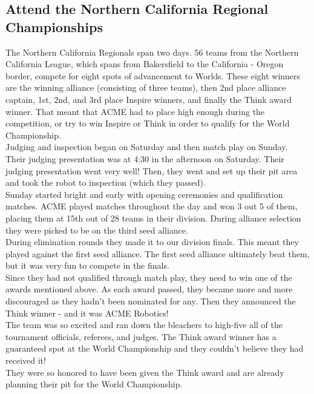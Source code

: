\documentclass{article}
\begin{document}
\subsection{Attend the Northern California Regional Championships}
The Northern California Regionals span two days. 56 teams from the Northern California League, which spans from Bakersfield to the California - Oregon border, compete for eight spots of advancement to Worlds. These eight winners are the winning alliance (consisting of three teams), then 2nd place alliance captain, 1st, 2nd, and 3rd place Inspire winners, and finally the Think award winner. That meant that ACME had to place high enough during the competition, or try to win Inspire or Think in order to qualify for the World Championship. \\

Judging and inspection began on Saturday and then match play on Sunday. Their judging presentation was at 4:30 in the afternoon on Saturday. Their judging presentation went very well! Then, they went and set up their pit area and took the robot to inspection (which they passed). \\

Sunday started bright and early with opening ceremonies and qualification matches. ACME played matches throughout the day and won 3 out 5 of them, placing them at 15th out of 28 teams in their division. During alliance selection they were picked to be on the third seed alliance. \\

During elimination rounds they made it to our division finals. This meant they played against the first seed alliance. The first seed alliance ultimately beat them, but it was very fun to compete in the finals. \\

Since they had not qualified through match play, they need to win one of the awards mentioned above. As each award passed, they became more and more discouraged as they hadn't been nominated for any. Then they announced the Think winner - and it was ACME Robotics! \\

The team was so excited and ran down the bleachers to high-five all of the tournament officials, referees, and judges. The Think award winner has a guaranteed spot at the World Championship and they couldn't believe they had received it! \\

They were so honored to have been given the Think award and are already planning their pit for the World Championship. \\
\end{document}
